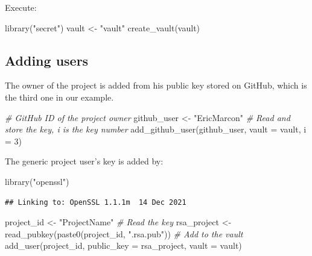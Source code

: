\documentclass[
  12pt,
  american,
  a4paper,
  extrafontsizes,onecolumn,openright
  ]{memoir}
\newenvironment{Shaded}{\begin{snugshade}}{\end{snugshade}}
\newcommand{\AttributeTok}[1]{\textcolor[rgb]{0.77,0.63,0.00}{#1}}
\newcommand{\CommentTok}[1]{\textcolor[rgb]{0.56,0.35,0.01}{\textit{#1}}}
\newcommand{\DecValTok}[1]{\textcolor[rgb]{0.00,0.00,0.81}{#1}}
\newcommand{\FunctionTok}[1]{\textcolor[rgb]{0.00,0.00,0.00}{#1}}
\newcommand{\NormalTok}[1]{#1}
\newcommand{\OtherTok}[1]{\textcolor[rgb]{0.56,0.35,0.01}{#1}}
\newcommand{\StringTok}[1]{\textcolor[rgb]{0.31,0.60,0.02}{#1}}
\begin{document}
Execute:

\scriptsize

\begin{Shaded}
\begin{Highlighting}[]
\FunctionTok{library}\NormalTok{(}\StringTok{"secret"}\NormalTok{)}
\NormalTok{vault }\OtherTok{\textless{}{-}} \StringTok{"vault"}
\FunctionTok{create\_vault}\NormalTok{(vault)}
\end{Highlighting}
\end{Shaded}

\normalsize

\hypertarget{adding-users}{%
\subsection{Adding users}\label{adding-users}}

The owner of the project is added from his public key stored on GitHub, which is the third one in our example.

\scriptsize

\begin{Shaded}
\begin{Highlighting}[]
\CommentTok{\# GitHub ID of the project owner}
\NormalTok{github\_user }\OtherTok{\textless{}{-}} \StringTok{"EricMarcon"}
\CommentTok{\# Read and store the key, i is the key number}
\FunctionTok{add\_github\_user}\NormalTok{(github\_user, }\AttributeTok{vault =}\NormalTok{ vault, }\AttributeTok{i =} \DecValTok{3}\NormalTok{)}
\end{Highlighting}
\end{Shaded}

\normalsize

The generic project user's key is added by:

\scriptsize

\begin{Shaded}
\begin{Highlighting}[]
\FunctionTok{library}\NormalTok{(}\StringTok{"openssl"}\NormalTok{)}
\end{Highlighting}
\end{Shaded}

\begin{verbatim}
## Linking to: OpenSSL 1.1.1m  14 Dec 2021
\end{verbatim}

\begin{Shaded}
\begin{Highlighting}[]
\NormalTok{project\_id }\OtherTok{\textless{}{-}} \StringTok{"ProjectName"}
\CommentTok{\# Read the key}
\NormalTok{rsa\_project }\OtherTok{\textless{}{-}} \FunctionTok{read\_pubkey}\NormalTok{(}\FunctionTok{paste0}\NormalTok{(project\_id, }\StringTok{".rsa.pub"}\NormalTok{))}
\CommentTok{\# Add to the vault}
\FunctionTok{add\_user}\NormalTok{(project\_id, }\AttributeTok{public\_key =}\NormalTok{ rsa\_project, }\AttributeTok{vault =}\NormalTok{ vault)}
\end{Highlighting}
\end{Shaded}
\end{document}
